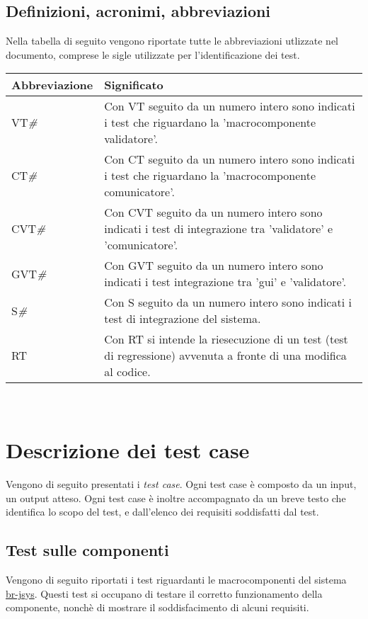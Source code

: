 \section{Definizioni, acronimi, abbreviazioni}
Nella tabella di seguito vengono riportate tutte le abbreviazioni utlizzate nel documento, comprese le sigle utilizzate per l'identificazione dei test.
\begin{center}
\begin{tabular}{||p{3.0cm}||p{8.5cm}||} \hline
\textbf{Abbreviazione} & \textbf{Significato} \\ \hline

VT\textit{\#} & Con VT seguito da un numero intero sono indicati i test che riguardano la 'macrocomponente validatore'.\\ \hline
CT\textit{\#} & Con CT seguito da un numero intero sono indicati i test che riguardano la 'macrocomponente comunicatore'.\\ \hline
CVT\textit{\#} & Con CVT seguito da un numero intero sono indicati i test di integrazione tra 'validatore' e 'comunicatore'.\\ \hline
GVT\textit{\#} & Con GVT seguito da un numero intero sono indicati i test integrazione tra 'gui' e 'validatore'.\\ \hline
S\textit{\#} & Con S seguito da un numero intero sono indicati i test di integrazione del sistema.\\ \hline
RT\textit{} & Con RT si intende la riesecuzione di un test (test di regressione) avvenuta a fronte di una modifica al codice.\\ \hline

\end{tabular} \\
\end{center}

\chapter{Descrizione dei test case}
Vengono di seguito presentati i \textit{test case}. Ogni test case \`e composto da un input, un output atteso. Ogni test case \`e inoltre accompagnato da un breve testo che identifica lo scopo del test, e dall'elenco dei requisiti soddisfatti dal test.

\section{Test sulle componenti}
Vengono di seguito riportati i test riguardanti le macrocomponenti del sistema \underline{br-jsys}. Questi test si occupano di testare il corretto funzionamento della componente, nonch\`e di mostrare il soddisfacimento di alcuni requisiti.

